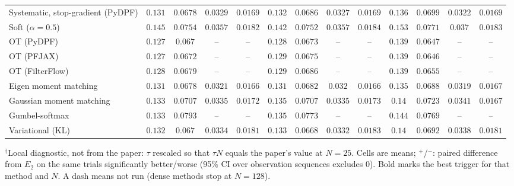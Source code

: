 \begin{table}[ht]
\begin{adjustbox}{max width=\linewidth}
\begin{tabular}{lcccc|cccc|cccc}
Systematic, stop-gradient (PyDPF) & $\mathbf{0.131}$ & $\mathbf{0.0678}$ & $0.0329$ & $0.0169$ & $0.132$ & $0.0686$ & $0.0327$ & $\mathbf{0.0169}$ & $0.136$ & $0.0699$ & $\mathbf{0.0322}$ & $0.0169$ \\
Soft ($\alpha{=}0.5$) & $0.145$ & $0.0754$ & $0.0357$ & $\mathbf{0.0182}$ & $\mathbf{0.142}$ & $\mathbf{0.0752}$ & $\mathbf{0.0357}$ & $0.0184$ & $0.153$ & $0.0771$ & $0.037$ & $0.0183$ \\
OT (PyDPF) & $\mathbf{0.127}$ & $0.067$ & -- & -- & $0.128$ & $0.0673$ & -- & -- & $0.139$ & $\mathbf{0.0647}$ & -- & -- \\
OT (PFJAX) & $\mathbf{0.127}$ & $0.0672$ & -- & -- & $0.129$ & $0.0675$ & -- & -- & $0.139$ & $\mathbf{0.0646}$ & -- & -- \\
OT (FilterFlow) & $\mathbf{0.128}$ & $0.0679$ & -- & -- & $0.129$ & $0.0686$ & -- & -- & $0.139$ & $\mathbf{0.0655}$ & -- & -- \\
Eigen moment matching & $\mathbf{0.131}$ & $\mathbf{0.0678}$ & $0.0321$ & $\mathbf{0.0166}$ & $0.131$ & $0.0682$ & $0.032$ & $0.0166$ & $0.135$ & $0.0688$ & $\mathbf{0.0319}$ & $0.0167$ \\
Gaussian moment matching & $\mathbf{0.133}$ & $0.0707$ & $0.0335$ & $0.0172$ & $0.135$ & $\mathbf{0.0707}$ & $\mathbf{0.0335}$ & $0.0173$ & $0.14$ & $0.0723$ & $0.0341$ & $\mathbf{0.0167}$ \\
Gumbel-softmax & $\mathbf{0.133}$ & $0.0793$ & -- & -- & $0.135$ & $0.0773$ & -- & -- & $0.144$ & $\mathbf{0.0769}$ & -- & -- \\
Variational (KL) & $\mathbf{0.132}$ & $0.067$ & $0.0334$ & $\mathbf{0.0181}$ & $0.133$ & $\mathbf{0.0668}$ & $\mathbf{0.0332}$ & $0.0183$ & $0.14$ & $0.0692$ & $0.0338$ & $0.0181$ \\
\bottomrule
\end{tabular}
\end{adjustbox}
\par\smallskip\parbox{0.95\linewidth}{\footnotesize $^\dagger$Local diagnostic, not from the paper: $\tau$ rescaled so that $\tau N$ equals the paper's value at $N{=}25$. Cells are means; $^{+}$/$^{-}$: paired difference from $E_2$ on the same trials significantly better/worse (95\% CI over observation sequences excludes 0). Bold marks the best trigger for that method and $N$. A dash means not run (dense methods stop at $N{=}128$).}
\end{table}

